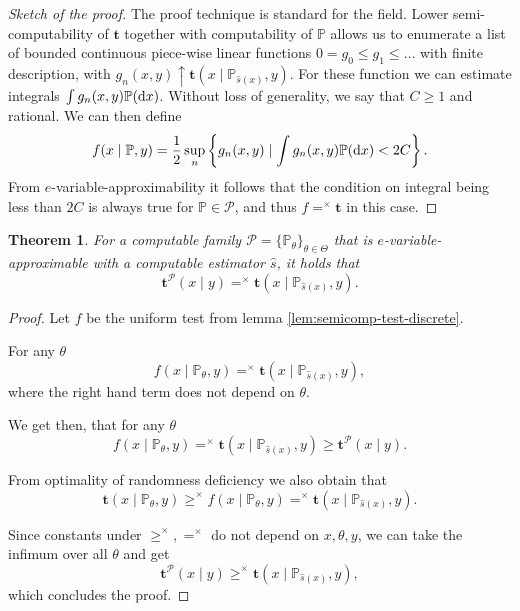 \documentclass{article}
\newtheorem{theorem}{Theorem}
\theoremstyle{definition}
\theoremstyle{definition}
\newcommand{\probP}{\mathbb{P}}
\newcommand{\uut}{\mathbf{t}}
\begin{document}
\begin{proof}[Sketch of the proof]
    The proof technique is standard for the field.
    Lower semi-computability of $\uut$ together with computability of $\probP$ allows us to enumerate a list of bounded continuous piece-wise linear functions $0=g_0 \le g_1\le\ldots$ with finite description, with $g_n(x, y)\uparrow \uut(x\mid\probP_{\hat s(x)}, y)$. For these function we can estimate integrals $\int g_n(x, y)\probP({\rm d}x)$. Without loss of generality, we say that $C \ge 1$ and rational. We can then define
    \[
        f(x\mid \probP, y) = \frac{1}{2} \sup_n \left\{g_n(x, y) \mid \int g_n(x, y)\probP({\rm d}x) < 2C\right\}.
    \]
    From $e$-variable-approximability it follows that the condition on integral being less than $2C$ is always true for $\probP \in \mathcal{P}$, and thus $f =^\times \uut$ in this case.
\end{proof}


\begin{theorem}\label{thm:rand-def-of-a-family}
    For a computable family $\mathcal{P} = \{\probP_\theta\}_{\theta\in\Theta}$ that is $e$-variable-approximable with a computable estimator $\hat{s}$, it holds that
    \[
        \uut^{\mathcal{P}}(x\mid y) =^\times \uut(x \mid \probP_{\hat s(x)}, y).
    \]
\end{theorem}

\begin{proof}
    Let $f$ be the uniform test from lemma \ref{lem:semicomp-test-discrete}.
    
    For any $\theta$
        \[
            f(x\mid \probP_\theta, y) =^\times \uut(x \mid \probP_{\hat s(x)}, y),
        \]
    where the right hand term does not depend on $\theta$.
    
    We get then, that for any $\theta$
    \[
        f(x\mid \probP_\theta, y) =^\times \uut(x\mid \probP_{\hat s(x)}, y) \ge \uut^{\mathcal{P}}(x\mid y).
    \]

    From optimality of randomness deficiency we also obtain that
    \[
        \uut(x\mid \probP_\theta, y) \ge^\times f(x \mid \probP_\theta, y) =^\times \uut(x \mid\probP_{\hat s(x)}, y).
    \]

    Since constants under $\ge^\times, =^\times$ do not depend on $x, \theta, y$, we can take the infimum over all $\theta$ and get
    \[
        \uut^{\mathcal{P}}(x\mid y) \ge^\times \uut(x \mid \probP_{\hat s(x)}, y),
    \]
    which concludes the proof.
\end{proof}
\end{document}
